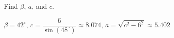 {Find $\beta$, $a$, and $c$.

\begin{center}
\end{center}}
{$\beta = 42^{\circ}$, $c = \dfrac{6}{\sin(48^{\circ})} \approx 8.074$, $a = \sqrt{c^2 - 6^2} \approx 5.402$}